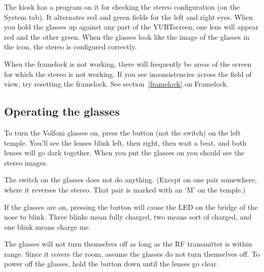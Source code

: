 \documentclass[11pt]{article}
\newcommand{\yurt}{YURT}
\begin{document}
The kiosk has a program on it for checking the stereo configuration
(on the System tab).  It alternates red and green fields for the left
and right eyes.  When you hold the glasses up against any part of the
\yurt screen, one lens will appear red and the other green.  When the
glasses look like the image of the glasses in the icon, the stereo is
configured correctly.  

When the framelock is not working, there will frequently be areas of
the screen for which the stereo is not working.  If you see
inconsistencies across the field of view, try resetting the
framelock.  See section~\ref{framelock} on Framelock. 

\subsection{Operating the glasses}

To turn the Volfoni glasses on, press the button (not the switch) on
the left temple.  You'll see the lenses blink left, then right, then
wait a beat, and both lenses will go dark together.  When you put the
glasses on you should see the stereo images.

The switch on the glasses does not do
anything.  (Except on one pair somewhere, where it reverses the
stereo.  That pair is marked with an `M' on the temple.)

If the glasses are on, pressing the button will cause the LED on the
bridge of the nose to blink.  Three blinks mean fully charged, two
means sort of charged, and one blink means charge me.

The glasses will not turn themselves off as long as the RF transmitter
is within range.  Since it covers the room, assume the glasses do not
turn themselves off.  To power off the glasses, hold the button down
until the lenses go clear.
\end{document}
